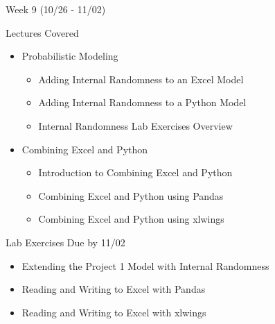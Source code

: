 \documentclass[]{article}
\begin{document}
\begin{section}{Week 9 (10/26 - 11/02)}
\begin{subsection}{Lectures Covered}
\begin{itemize}
\item Probabilistic Modeling
\begin{itemize}
\item Adding Internal Randomness to an Excel Model
\item Adding Internal Randomness to a Python Model
\item Internal Randomness Lab Exercises Overview
\end{itemize}
\end{itemize}
\begin{itemize}
\item Combining Excel and Python
\begin{itemize}
\item Introduction to Combining Excel and Python
\item Combining Excel and Python using Pandas
\item Combining Excel and Python using xlwings
\end{itemize}
\end{itemize}
\end{subsection}
\begin{subsection}{Lab Exercises Due by 11/02}
\begin{itemize}
\item Extending the Project 1 Model with Internal Randomness
\item Reading and Writing to Excel with Pandas
\item Reading and Writing to Excel with xlwings
\end{itemize}
\end{subsection}
\end{section}
\end{document}
